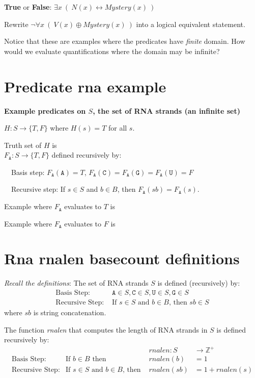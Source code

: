 \documentclass[12pt, oneside]{article}
\newcommand{\A}[0]{\texttt{A}}
\newcommand{\C}[0]{\texttt{C}}
\newcommand{\G}[0]{\texttt{G}}
\newcommand{\U}[0]{\texttt{U}}
\begin{document}
{\bf True} or {\bf False}: $\exists x~ (~N(x) \leftrightarrow Mystery(x)~)$

Rewrite $\lnot \forall x~(~V(x) \oplus Mystery(x)~)$ into a logical equivalent statement.

\vspace{50pt}


Notice that these are examples where the predicates have {\it finite} domain.
How would we evaluate quantifications where the domain may be infinite? \vfill
\section*{Predicate rna example}


{\bf Example predicates on $S$, the set of RNA strands (an infinite set)}


$H: S \to \{T, F\}$ where $H(s) = T$ for all $s$.

Truth set of $H$ is \underline{}\\

$F_{\A}: S \to \{T, F\}$  defined recursively by: 

~~Basis step: $F_{\A}(\A) = T$, $F_{\A}(\C) = F_{\A}(\G) = F_{\A}(\U) = F$

~~Recursive step: If $s \in S$ and $b \in B$, then $F_{\A}(sb) = F_{\A}(s)$.

Example where $F_{\A}$ evaluates to $T$ is \underline{\phantom{$\A\C\G$~\hspace{1in}}}

Example where $F_{\A}$ evaluates to $F$ is \underline{\phantom{$\U\A\C\U$\hspace{1in}}} \vfill
\section*{Rna rnalen basecount definitions}


{\it Recall the definitions}: The set of RNA strands $S$ is defined (recursively) by:
\[
\begin{array}{ll}
\textrm{Basis Step: } & \A \in S, \C \in S, \U \in S, \G \in S \\
\textrm{Recursive Step: } & \textrm{If } s \in S\textrm{ and }b \in B \textrm{, then }sb \in S
\end{array}
\]
where $sb$ is string concatenation.

The function \textit{rnalen} that computes the length of RNA strands in $S$ is defined recursively by:
\[
\begin{array}{llll}
& & \textit{rnalen} : S & \to \mathbb{Z}^+ \\
\textrm{Basis Step:} & \textrm{If } b \in B\textrm{ then } & \textit{rnalen}(b) & = 1 \\
\textrm{Recursive Step:} & \textrm{If } s \in S\textrm{ and }b \in B\textrm{, then  } & \textit{rnalen}(sb) & = 1 + \textit{rnalen}(s)
\end{array}
\]
\end{document}
